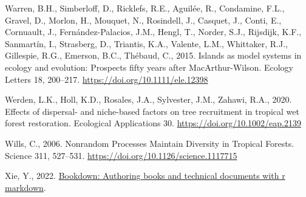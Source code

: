 \documentclass[
  12pt,
]{article}
\newlength{\cslhangindent}
\newlength{\cslentryspacingunit} %
\newenvironment{CSLReferences}[2] %
 {%
  \setlength{\parindent}{0pt}
  \ifodd #1
  \let\oldpar\par
  \def\par{\hangindent=\cslhangindent\oldpar}
  \fi
  \setlength{\parskip}{#2\cslentryspacingunit}
 }%
 {}
\begin{document}
\begin{CSLReferences}{1}{0}
\leavevmode{}%
Warren, B.H., Simberloff, D., Ricklefs, R.E., Aguilée, R., Condamine, F.L., Gravel, D., Morlon, H., Mouquet, N., Rosindell, J., Casquet, J., Conti, E., Cornuault, J., Fernández-Palacios, J.M., Hengl, T., Norder, S.J., Rijsdijk, K.F., Sanmartín, I., Strasberg, D., Triantis, K.A., Valente, L.M., Whittaker, R.J., Gillespie, R.G., Emerson, B.C., Thébaud, C., 2015. Islands as model systems in ecology and evolution: Prospects fifty years after {MacArthur-Wilson}. Ecology Letters 18, 200--217. \url{https://doi.org/10.1111/ele.12398}

\leavevmode{}%
Werden, L.K., Holl, K.D., Rosales, J.A., Sylvester, J.M., Zahawi, R.A., 2020. Effects of dispersal- and niche-based factors on tree recruitment in tropical wet forest restoration. Ecological Applications 30. \url{https://doi.org/10.1002/eap.2139}

\leavevmode{}%
Wills, C., 2006. Nonrandom {Processes Maintain Diversity} in {Tropical Forests}. Science 311, 527--531. \url{https://doi.org/10.1126/science.1117715}

\leavevmode{}%
Xie, Y., 2022. \href{https://github.com/rstudio/bookdown}{Bookdown: Authoring books and technical documents with r markdown}.

\end{CSLReferences}
\end{document}
